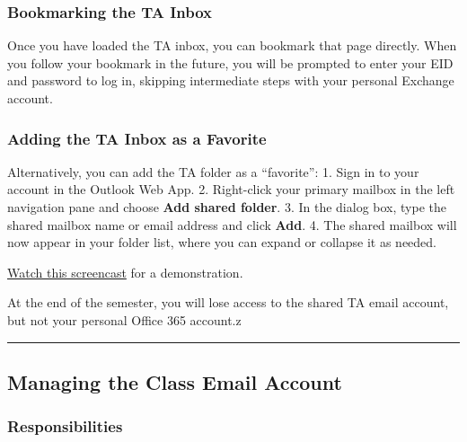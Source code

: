 \documentclass[
]{article}
\begin{document}
\hypertarget{bookmarking-the-ta-inbox}{%
\subsubsection{Bookmarking the TA Inbox}\label{bookmarking-the-ta-inbox}}

Once you have loaded the TA inbox, you can bookmark that page directly. When you follow your bookmark in the future, you will be prompted to enter your EID and password to log in, skipping intermediate steps with your personal Exchange account.

\hypertarget{adding-the-ta-inbox-as-a-favorite}{%
\subsubsection{Adding the TA Inbox as a Favorite}\label{adding-the-ta-inbox-as-a-favorite}}

Alternatively, you can add the TA folder as a ``favorite'':
1. Sign in to your account in the Outlook Web App.
2. Right-click your primary mailbox in the left navigation pane and choose \textbf{Add shared folder}.
3. In the dialog box, type the shared mailbox name or email address and click \textbf{Add}.
4. The shared mailbox will now appear in your folder list, where you can expand or collapse it as needed.

\href{https://utexas.app.box.com/file/455642023256?s=el16kugfwchp7ymkne5fenl1qaye9kpo}{Watch this screencast} for a demonstration.

At the end of the semester, you will lose access to the shared TA email account, but not your personal Office 365 account.z

\begin{center}\rule{0.5\linewidth}{0.5pt}\end{center}

\hypertarget{managing-the-class-email-account}{%
\subsection{Managing the Class Email Account}\label{managing-the-class-email-account}}

\hypertarget{responsibilities}{%
\subsubsection{Responsibilities}\label{responsibilities}}
\end{document}
